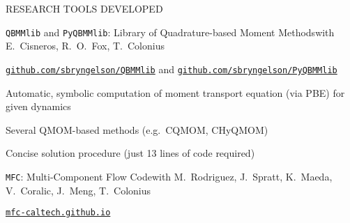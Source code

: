 \documentclass{resume} %
\begin{document}
\begin{rSection}{{\Large R}ESEARCH TOOLS DEVELOPED}


\begin{rSubsections}{\texttt{QBMMlib} and \texttt{PyQBMMlib}: Library of Quadrature-based Moment Methods}{}{with E.\ Cisneros, R.\ O.\ Fox, T.\ Colonius}{}

\vspace{-0.4cm}
\href{https://github.com/sbryngelson/QBMMlib}{\texttt{github.com/sbryngelson/QBMMlib}}
and \href{https://github.com/sbryngelson/PyQBMMlib}{\texttt{github.com/sbryngelson/PyQBMMlib}}

    \vspace{-0.1cm}
    \begin{minipage}{0.99\linewidth}
	\begin{list}{\textbullet}{\leftmargin=2.5em} 
        \item Automatic, symbolic computation of moment transport equation (via PBE) for given dynamics
        \item Several QMOM-based methods (e.g.\ CQMOM, CHyQMOM)
        \item Concise solution procedure (just 13 lines of code required)
  	\end{list}
    \end{minipage}
\end{rSubsections}
\medskip

\begin{rSubsections}{\texttt{MFC}: Multi-Component Flow Code}{}{with M.\ Rodriguez, J.\ Spratt, K.\ Maeda, V.\ Coralic, J.\ Meng, T.\ Colonius}{}

\vspace{-0.4cm}
\href{https://mfc-caltech.github.io/}{\texttt{mfc-caltech.github.io}}


\end{rSubsections}
\end{rSection}
\end{document}
